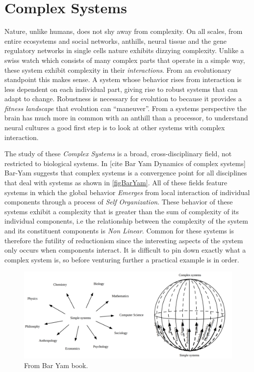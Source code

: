 \section{Complex Systems}
%
Nature, unlike humans, does not shy away from complexity.
On all scales, from entire ecosystems and social networks, anthills, neural
tissue and the gene regulatory networks in single cells nature exhibits dizzying
complexity.
%
Unlike a swiss watch which consists of many complex parts that operate in a
simple way, these system exhibit complexity in their \emph{interactions}.
%
From an evolutionary standpoint this makes sense.
A system whose behavior rises from interaction is less dependent on each
individual part, giving rise to robust systems that can adapt to change.
Robustness is necessary for evolution to because it provides a \emph{fitness
landscape} that evolution can ``maneuver''.
%
From a systems perspective the brain has much more in common with an anthill
than a processor, to understand neural cultures a good first step is to look at
other systems with complex interaction.\par
%
%
The study of these \emph{Complex Systems} is a broad, cross-disciplinary field,
not restricted to biological systems.
%
In [cite Bar Yam Dynamics of complex systems] Bar-Yam suggests that complex
systems is a convergence point for all disciplines that deal with systems as
shown in \ref{figBarYam}.
%
All of these fields feature systems in which the global behavior \emph{Emerges}
from local interaction of individual components through a process of \emph{Self
  Organization}.
These behavior of these systems exhibit a complexity that is greater than the
sum of complexity of its individual components, i.e the relationship between the
complexity of the system and its constituent components is \emph{Non Linear}.
Common for these systems is therefore the futility of reductionism since the
interesting aspects of the system only occurs when components interact.
It is difficult to pin down exactly what a complex system is, so before
venturing further a practical example is in order.
\begin{figure}[h!]
  \centering
  \includegraphics[width=1\textwidth]{fig/BarYamCX.png}
  \caption{From Bar Yam book.}
  \label{figCX}
\end{figure}

